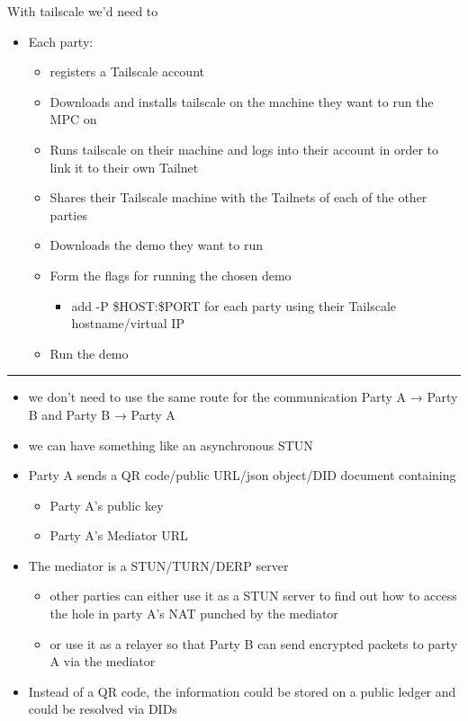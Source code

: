 With tailscale we'd need to

\begin{itemize}
\tightlist
\item
  Each party:

  \begin{itemize}
  \tightlist
  \item
    registers a Tailscale account
  \item
    Downloads and installs tailscale on the machine they want to run the
    MPC on
  \item
    Runs tailscale on their machine and logs into their account in order
    to link it to their own Tailnet
  \item
    Shares their Tailscale machine with the Tailnets of each of the
    other parties
  \item
    Downloads the demo they want to run
  \item
    Form the flags for running the chosen demo

    \begin{itemize}
    \tightlist
    \item
      add -P \$HOST:\$PORT for each party using their Tailscale
      hostname/virtual IP
    \end{itemize}
  \item
    Run the demo
  \end{itemize}
\end{itemize}

\begin{center}\rule{0.5\linewidth}{0.5pt}\end{center}

\begin{itemize}
\tightlist
\item
  we don't need to use the same route for the communication Party A →
  Party B and Party B → Party A
\item
  we can have something like an asynchronous STUN
\item
  Party A sends a QR code/public URL/json object/DID document containing

  \begin{itemize}
  \tightlist
  \item
    Party A's public key
  \item
    Party A's Mediator URL
  \end{itemize}
\item
  The mediator is a STUN/TURN/DERP server

  \begin{itemize}
  \tightlist
  \item
    other parties can either use it as a STUN server to find out how to
    access the hole in party A's NAT punched by the mediator
  \item
    or use it as a relayer so that Party B can send encrypted packets to
    party A via the mediator
  \end{itemize}
\item
  Instead of a QR code, the information could be stored on a public
  ledger and could be resolved via DIDs
\end{itemize}


